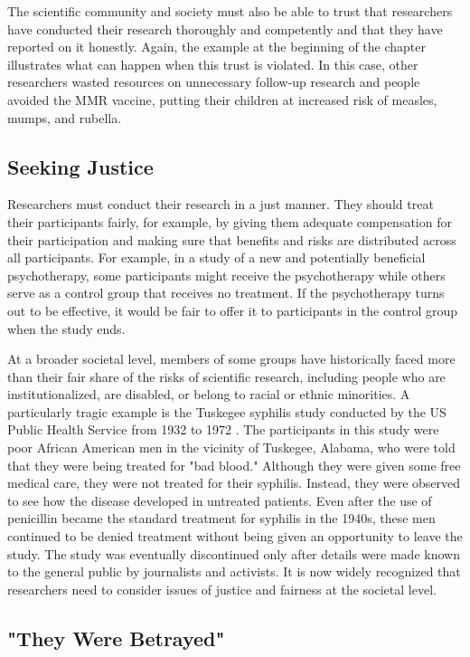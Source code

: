 The scientific community and society must also be able to trust that researchers have conducted their research thoroughly and competently and that they have reported on it honestly. Again, the example at the beginning of the chapter illustrates what can happen when this trust is violated. In this case, other researchers wasted resources on unnecessary follow-up research and people avoided the MMR vaccine, putting their children at increased risk of measles, mumps, and rubella.

\subsection{Seeking Justice}

Researchers must conduct their research in a just manner. They should treat their participants fairly, for example, by giving them adequate compensation for their participation and making sure that benefits and risks are distributed across all participants. For example, in a study of a new and potentially beneficial psychotherapy, some participants might receive the psychotherapy while others serve as a control group that receives no treatment. If the psychotherapy turns out to be effective, it would be fair to offer it to participants in the control group when the study ends.

At a broader societal level, members of some groups have historically faced more than their fair share of the risks of scientific research, including people who are institutionalized, are disabled, or belong to racial or ethnic minorities. A particularly tragic example is the Tuskegee syphilis study conducted by the US Public Health Service from 1932 to 1972 \citep{reverby_examining_2009}. The participants in this study were poor African American men in the vicinity of Tuskegee, Alabama, who were told that they were being treated for "bad blood." Although they were given some free medical care, they were not treated for their syphilis. Instead, they were observed to see how the disease developed in untreated patients. Even after the use of penicillin became the standard treatment for syphilis in the 1940s, these men continued to be denied treatment without being given an opportunity to leave the study. The study was eventually discontinued only after details were made known to the general public by journalists and activists. It is now widely recognized that researchers need to consider issues of justice and fairness at the societal level.

\subsection{"They Were Betrayed"}

